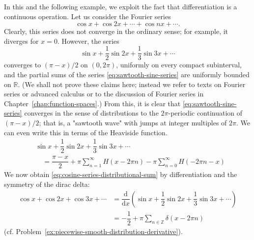 \begin{Example}
\label{ex:fourier-series-distribution}
In this and the following example, we exploit the fact that differentiation is a continuous operation. Let us consider the Fourier series
\begin{equation}\label{eq:cosine-series-distributional-sum}
\cos x+\cos2x+\cdots+\cos nx+\cdots.
\end{equation}
Clearly, this series does not converge in the ordinary sense; for example, it diverges for $x=0$. However, the series
\begin{equation}\label{eq:sawtooth-sine-series}
\sin x+\dfrac12\sin2x+\dfrac13\sin3x+\cdots
\end{equation}
converges to $(\pi-x)/2$ on $(0,2\pi)$, uniformly on every compact subinterval, and the partial sums of the series \eqref{eq:sawtooth-sine-series} are uniformly bounded on $\mathbb{R}$. (We shall not prove these claims here; instead we refer to texts on Fourier series or advanced calculus or to the discussion of Fourier series in Chapter~\ref{chap:function-spaces}.) From this, it is clear that \eqref{eq:sawtooth-sine-series} converges in the sense of distributions to the $2\pi$-periodic continuation of $(\pi-x)/2$; that is, a "sawtooth wave" with jumps at integer multiples of $2\pi$. We can even write this in terms of the Heaviside function.\[
\begin{aligned}
&\sin x+\dfrac12\sin2x+\dfrac13\sin3x+\cdots\\
&\quad=\dfrac{\pi-x}2+\pi\sum_{n=1}^\infty H(x-2\pi n)-\pi\sum_{n=0}^\infty H(-2\pi n-x)
\end{aligned}
\]We now obtain \eqref{eq:cosine-series-distributional-sum} by differentiation and the symmetry of the dirac delta:
\begin{equation}\label{eq:cosine-series-dirac-comb}
\begin{aligned}
\cos x+\cos2x+\cos3x+\cdots
&=\dfrac{\mathrm{d}}{\mathrm{d}x}\left(\sin x+\dfrac12\sin2x+\dfrac13\sin3x+\cdots\right)\\
&=-\dfrac12+\pi\sum_{n\in\mathbb{Z}}\delta(x-2\pi n)
\end{aligned}
\end{equation}
(cf. Problem~\ref{ex:piecewise-smooth-distribution-derivative}).
\end{Example}

